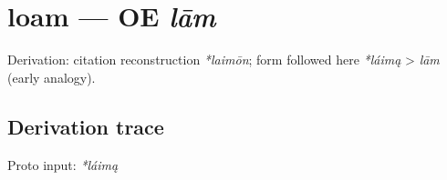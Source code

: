 \documentclass[
  british,
  a4paper,
  openany]{book}
\providecommand{\texorpdfstring}[2]{#1}
\begin{document}
\section{\texorpdfstring{loam --- OE
\emph{lām}}{loam --- OE lām}}\label{loam-oe-lux101m}


Derivation: citation reconstruction \emph{*laimōn}; form followed here
\emph{*láimą} \textgreater{} \emph{lām} (early analogy).

\subsection{Derivation trace}\label{derivation-trace-87}

Proto input: \emph{*láimą}

\begingroup
\setlength{\fboxsep}{6pt}
\end{document}
